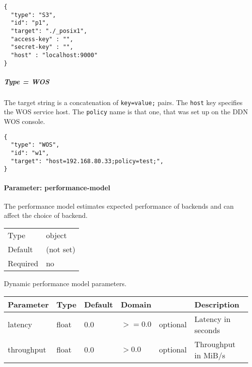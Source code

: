 \begin{lstlisting}
{
  "type": "S3",
  "id": "p1",
  "target": "./_posix1",
  "access-key" : "",
  "secret-key" : "",
  "host" : "localhost:9000"
}
\end{lstlisting}
\FloatBarrier
\vspace{\gapsize}


\subparagraph{Type = WOS}
The target string is a concatenation of \lstinline|key=value;| pairs.
The \lstinline|host| key specifies the WOS service host.
The \lstinline|policy| name is that one, that was set up on the DDN WOS console.

\begin{lstlisting}
{
  "type": "WOS",
  "id": "w1",
  "target": "host=192.168.80.33;policy=test;",
}
\end{lstlisting}
\FloatBarrier
\vspace{\gapsize}


\paragraph{Parameter: performance-model}
The performance model estimates expected performance of backends and can affect the choice of backend.

\begin{preserve}
  \noindent
  \begin{tabular}{ll}
    Type     & object \\ 
    Default  & (not set)       \\ 
    Required & no      \\ 
  \end{tabular}
\end{preserve}

Dynamic performance model parameters.

  \begin{center}
    \begin{tabularx}{\textwidth}{lllllX}
      Parameter  & Type  & Default & Domain &          & Description \\ 
      \hline
      latency    & float & 0.0     & $>=0.0$  & optional & Latency in seconds     \\ 
      throughput & float & 0.0     & $>0.0$   & optional & Throughput in MiB/s       \\ 
    \end{tabularx}
  \end{center}

